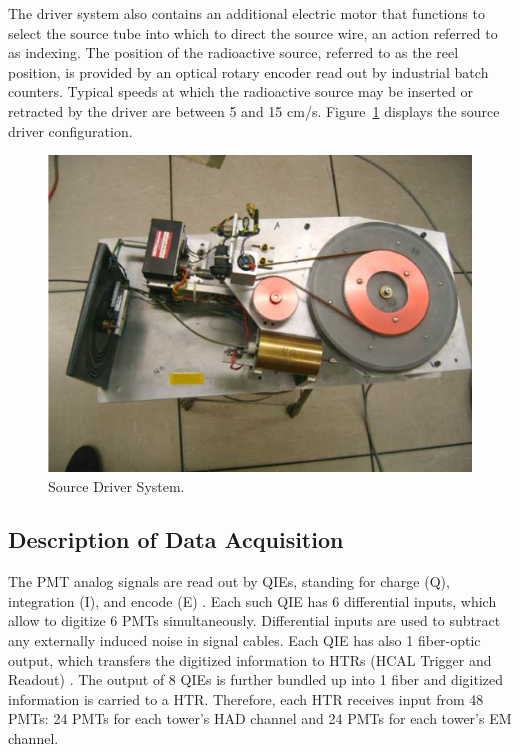 The driver system also contains an additional electric motor that functions to
select the source tube into which to direct the source wire, an action referred
to as indexing. The position of the radioactive source, referred to as the reel position, is provided by an optical rotary
encoder read out by industrial batch counters. Typical speeds at which the
radioactive source may be inserted or retracted by the driver are between 5 and
15 cm/s. Figure~\ref{fig:hf_expsetup_sourcedriver} displays the source driver configuration.
\begin{figure}[htb]
   \begin{center}
      \includegraphics[width=.8\textwidth]{figures/ch_hfcalibration/Source_Driver.png}
      \caption{Source Driver System.}
      \label{fig:hf_expsetup_sourcedriver}
   \end{center}
\end{figure}

\subsection{Description of Data Acquisition}
The PMT analog signals are read out by QIEs, standing for charge (Q),
integration (I), and encode (E) \cite{QIE-1}. Each such QIE has 6 differential inputs, which
allow to digitize 6 PMTs simultaneously. Differential inputs are used to subtract
any externally induced noise in signal cables. Each QIE has also 1 fiber-optic
output, which transfers the digitized information to HTRs (HCAL Trigger and
Readout) \cite{HTR}. The output of 8 QIEs is further bundled up into 1 fiber and digitized information is carried to a HTR. Therefore, each HTR receives input from 48 PMTs: 24 PMTs for each tower's HAD channel and 24 PMTs for each tower's EM channel.


